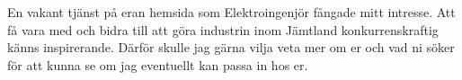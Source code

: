 \documentclass[11pt,a4paper,sans]{moderncv}        %
\begin{document}
En vakant tjänst på eran hemsida som Elektroingenjör fångade mitt intresse. Att få vara med och bidra till att göra industrin inom Jämtland konkurrenskraftig känns inspirerande. Därför skulle jag gärna vilja veta mer om er och vad ni söker för att kunna se om jag eventuellt kan passa in hos er.










\end{document}
